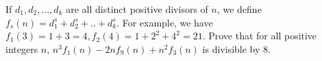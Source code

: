 If $d_1,d_2,...,d_k$ are all distinct positive divisors of $n$, we define $f_s(n) = d_1^s+d_2^s+..+d_k^s$.
For example, we have $f_1(3) = 1 + 3 = 4, f_2(4) = 1 + 2^2 + 4^2 = 21$.
Prove that for all positive integers $n$, $n^3f_1(n) - 2nf_9(n) + n^2f_3(n)$ is divisible by $8$.